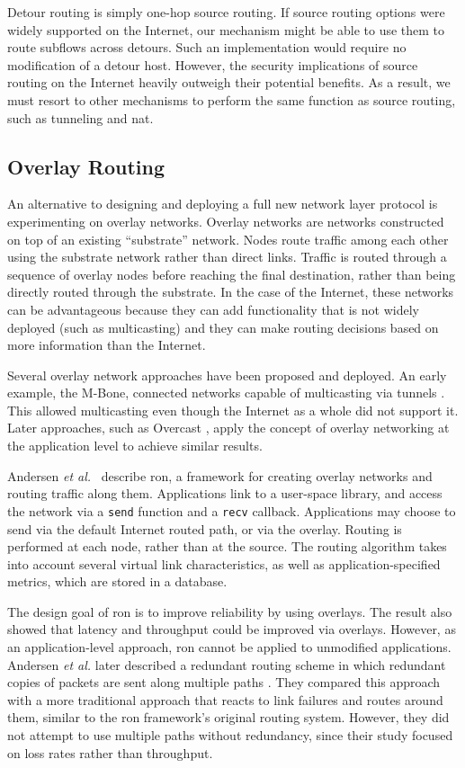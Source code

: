 \documentclass{cwru}
\begin{document}
Detour routing is simply one-hop source routing. If source routing options were
widely supported on the Internet, our mechanism might be able to use them to
route subflows across detours. Such an implementation would require no
modification of a detour host. However, the security implications of source
routing on the Internet heavily outweigh their potential benefits. As a result,
we must resort to other mechanisms to perform the same function as source
routing, such as tunneling and \ac{nat}.

\subsection{Overlay Routing}

An alternative to designing and deploying a full new network layer protocol is
experimenting on overlay networks. Overlay networks are networks constructed on
top of an existing ``substrate'' network. Nodes route traffic among each other
using the substrate network rather than direct links. Traffic is routed through
a sequence of overlay nodes before reaching the final destination, rather than
being directly routed through the substrate. In the case of the Internet, these
networks can be advantageous because they can add functionality that is not
widely deployed (such as multicasting) and they can make routing decisions based
on more information than the Internet.

Several overlay network approaches have been proposed and deployed. An early
example, the M-Bone, connected networks capable of multicasting via tunnels
\cite{mbone}. This allowed multicasting even though the Internet as a whole did
not support it. Later approaches, such as Overcast \cite{jannotti2000overcast},
apply the concept of overlay networking at the application level to achieve
similar results.

Andersen \textit{et al.}~\cite{ron} describe \ac{ron}, a framework for creating
overlay networks and routing traffic along them. Applications link to a
user-space library, and access the network via a \texttt{send} function and a
\texttt{recv} callback. Applications may choose to send via the default Internet
routed path, or via the overlay. Routing is performed at each node, rather than
at the source. The routing algorithm takes into account several virtual link
characteristics, as well as application-specified metrics, which are stored in a
database.

The design goal of \ac{ron} is to improve reliability by using overlays. The
result also showed that latency and throughput could be improved via overlays.
However, as an application-level approach, \ac{ron} cannot be applied to
unmodified applications. Andersen \textit{et al.} later described a redundant
routing scheme in which redundant copies of packets are sent along multiple
paths \cite{andersen2003best}. They compared this approach with a more
traditional approach that reacts to link failures and routes around them,
similar to the \ac{ron} framework's original routing system. However, they did
not attempt to use multiple paths without redundancy, since their study focused
on loss rates rather than throughput.
\end{document}
